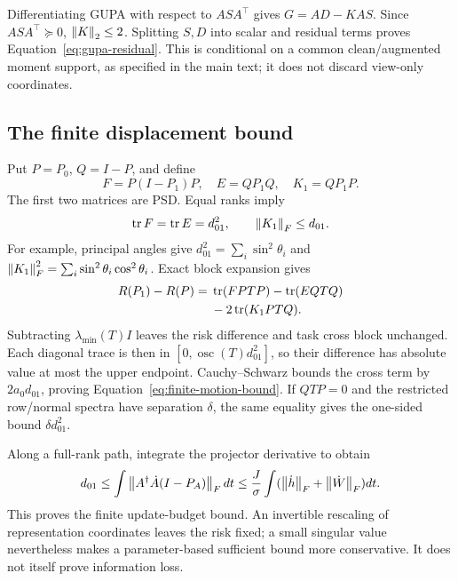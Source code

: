 Differentiating GUPA with respect to $ASA^\top$ gives $G=AD-KAS$. Since $ASA^\top\succeq0$, $\left\lVert K\right\rVert_2\le2$. Splitting $S,D$ into scalar and residual terms proves Equation~\eqref{eq:gupa-residual}. This is conditional on a common clean/augmented moment support, as specified in the main text; it does not discard view-only coordinates.

\subsection{The finite displacement bound}
Put $P=P_0$, $Q=I-P$, and define
\begin{equation}
 F=P(I-P_1)P,\quad E=QP_1Q,\quad K_1=QP_1P.
\end{equation}
The first two matrices are PSD. Equal ranks imply
\begin{equation}
 \operatorname{tr} F=\operatorname{tr} E=d_{01}^2,\qquad \left\lVert K_1\right\rVert_F\le d_{01}.
\end{equation}
For example, principal angles give $d_{01}^2=\sum_i\sin^2\theta_i$ and $\left\lVert K_1\right\rVert_F^2=\sum_i\sin^2\theta_i\cos^2\theta_i$. Exact block expansion gives
\begin{align}
 R(P_1)-R(P)={}&\operatorname{tr}(FPTP)-\operatorname{tr}(EQTQ)\\
 &-2\operatorname{tr}(K_1PTQ).\nonumber
 \label{eq:exact-leakage}
\end{align}
Subtracting $\lambda_{\min}(T)I$ leaves the risk difference and task cross block unchanged. Each diagonal trace is then in $[0,\operatorname{osc}(T)d_{01}^2]$, so their difference has absolute value at most the upper endpoint. Cauchy--Schwarz bounds the cross term by $2a_0d_{01}$, proving Equation~\eqref{eq:finite-motion-bound}. If $QTP=0$ and the restricted row/normal spectra have separation $\delta$, the same equality gives the one-sided bound $\delta d_{01}^2$.

Along a full-rank path, integrate the projector derivative to obtain
\begin{equation}
 d_{01}\le\int\left\lVert A^\dagger\dot A(I-P_A)\right\rVert_Fdt
 \le\frac J\sigma\int(\left\lVert \dot h\right\rVert_F+\left\lVert \dot W\right\rVert_F)dt.
\end{equation}
This proves the finite update-budget bound. An invertible rescaling of representation coordinates leaves the risk fixed; a small singular value nevertheless makes a parameter-based sufficient bound more conservative. It does not itself prove information loss.

